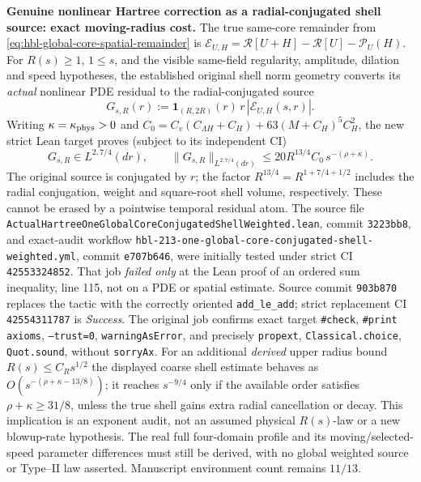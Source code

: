 \documentclass[11pt]{amsart}
\begin{document}
\medskip
\noindent\textbf{Genuine nonlinear Hartree correction as a radial-conjugated
shell source: exact moving-radius cost.}
The true same-core remainder from
\eqref{eq:hbl-global-core-spatial-remainder} is
\(\mathcal E_{U,H}=\mathcal R[U+H]-\mathcal R[U]-\mathcal P_U(H)\).
For \(R(s)\ge1\), \(1\le s\), and the visible same-field
regularity, amplitude, dilation and speed hypotheses, the established
original shell norm geometry converts its \emph{actual} nonlinear
PDE residual to the radial-conjugated source
\[
 G_{s,R}(r):=
 \mathbf1_{(R,2R)}(r)\,r\,|\mathcal E_{U,H}(s,r)|.
\]
Writing \(\kappa=\kappa_{\rm phys}>0\) and
\(C_0=C_v(C_{\Lambda H}+C_H)+63(M+C_H)^5C_H^2\), the new
strict Lean target proves (subject to its independent CI)
\[
 \boxed{\quad
  G_{s,R}\in L^{2,7/4}(dr),\qquad
  \|G_{s,R}\|_{L^{2,7/4}(dr)}
  \le20 R^{13/4}C_0\,s^{-(\rho+\kappa)}.
 \quad}
\]
The original source is conjugated by \(r\); the factor
\(R^{13/4}=R^{1+7/4+1/2}\) includes the radial
conjugation, weight and square-root shell volume, respectively.
These cannot be erased by a pointwise temporal residual atom.
The source file
\texttt{ActualHartreeOneGlobalCoreConjugatedShellWeighted.lean},
commit \texttt{3223bb8}, and exact-audit workflow
\texttt{hbl-213-one-global-core-conjugated-shell-weighted.yml},
commit \texttt{e707b646}, were initially tested under
strict CI \texttt{42553324852}.  That job \emph{failed only}
at the Lean proof of an ordered sum inequality, line 115,
not on a PDE or spatial estimate.  Source commit
\texttt{903b870} replaces the tactic with the correctly
oriented \texttt{add\_le\_add}; strict replacement CI
\texttt{42554311787} is \emph{Success}. The original job
confirms exact target \texttt{\#check}, \texttt{\#print axioms},
\texttt{--trust=0}, \texttt{warningAsError}, and precisely
\texttt{propext}, \texttt{Classical.choice}, \texttt{Quot.sound},
without \texttt{sorryAx}.
For an additional \emph{derived} upper radius bound
\(R(s)\le C_Rs^{1/2}\) the displayed coarse shell estimate behaves as
\(O(s^{-(\rho+\kappa-13/8)})\); it reaches \(s^{-9/4}\)
only if the available order satisfies
\(\rho+\kappa\ge31/8\), unless the true shell gains
extra radial cancellation or decay. This implication is an
exponent audit, not an assumed physical \(R(s)\)-law or a
new blowup-rate hypothesis.
The real full four-domain profile and its moving/selected-speed
parameter differences must still be derived, with no
global weighted source or Type--II law asserted. Manuscript
environment count remains \(11/13\).
\end{document}
